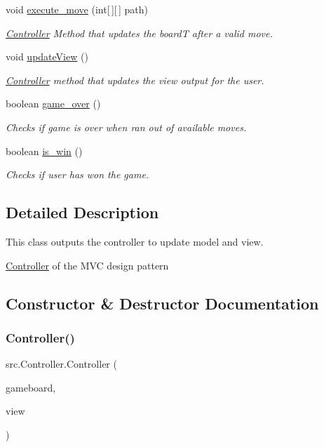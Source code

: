 \begin{DoxyCompactItemize}
void \hyperlink{classsrc_1_1Controller_aa1d328484901f41258cac4205803eeb4}{execute\+\_\+move} (int\mbox{[}$\,$\mbox{]}\mbox{[}$\,$\mbox{]} path)
\begin{DoxyCompactList}\small\item\em \hyperlink{classsrc_1_1Controller}{Controller} Method that updates the boardT after a valid move. \end{DoxyCompactList}\item 
void \hyperlink{classsrc_1_1Controller_abb1eafa89e545370a7ad98e293731d04}{update\+View} ()
\begin{DoxyCompactList}\small\item\em \hyperlink{classsrc_1_1Controller}{Controller} method that updates the view output for the user. \end{DoxyCompactList}\item 
boolean \hyperlink{classsrc_1_1Controller_ada325ebb1e30dea7f65ea1259a06ea22}{game\+\_\+over} ()
\begin{DoxyCompactList}\small\item\em Checks if game is over when ran out of available moves. \end{DoxyCompactList}\item 
boolean \hyperlink{classsrc_1_1Controller_a713dfa8a1f3d29238e099598b08ca30b}{is\+\_\+win} ()
\begin{DoxyCompactList}\small\item\em Checks if user has won the game. \end{DoxyCompactList}\end{DoxyCompactItemize}


\subsection{Detailed Description}
This class outputs the controller to update model and view. 

\hyperlink{classsrc_1_1Controller}{Controller} of the M\+VC design pattern 

\subsection{Constructor \& Destructor Documentation}
\mbox{\label{classsrc_1_1Controller_aeff9a0c7be01117a7ee1a3029d908b92}} 
\subsubsection{\texorpdfstring{Controller()}{Controller()}}
{\footnotesize\ttfamily src.\+Controller.\+Controller (\begin{DoxyParamCaption}\item[{\hyperlink{classsrc_1_1GameBoardT}{Game\+BoardT}}]{gameboard,  }\item[{\hyperlink{classsrc_1_1View}{View}}]{view }\end{DoxyParamCaption})}



